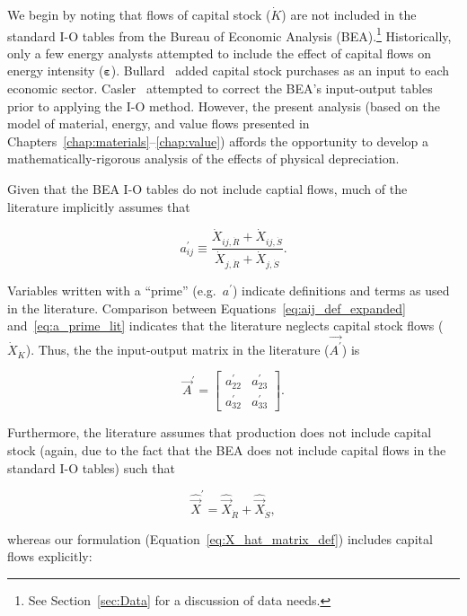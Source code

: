 We begin by noting that 
flows of capital stock ($\dot{K}$) are not included in the 
standard I-O tables from the
Bureau of Economic Analysis (BEA).\footnote{See
Section~\ref{sec:Data} for a discussion of data needs.}
Historically, only a few energy analysts attempted to include the effect
of capital flows on energy intensity ($\boldsymbol{\varepsilon}$). 
Bullard~\cite{Bullard1975} added capital stock purchases as an input
to each economic sector.
Casler~\cite{Casler:1983uy} attempted to correct the BEA's
input-output tables prior to applying the I-O method.
However, the present analysis (based on 
the model of material, energy, and value flows presented 
in Chapters~\ref{chap:materials}--\ref{chap:value})
affords the opportunity
to develop a mathematically-rigorous analysis
of the effects of physical depreciation.

Given that the BEA I-O tables do not include captial flows, 
much of the literature implicitly assumes that 

\begin{equation} \label{eq:a_prime_lit}
	a_{ij}^{'} 
	\equiv \frac{\dot{X}_{ij,\dot{R}} + \dot{X}_{ij,\dot{S}}}
				{\dot{X}_{j,\dot{R}} + \dot{X}_{j,\dot{S}}}.
\end{equation}

\noindent{}Variables written with a ``prime''
(e.g.\ $a^{'}$) indicate definitions and terms as used in the literature.
Comparison between Equations~\ref{eq:aij_def_expanded}
and~\ref{eq:a_prime_lit}
indicates that the literature neglects capital stock flows 
($\dot{X}_{\dot{K}}$).
Thus, the the input-output matrix in the literature
($\vec{A^{'}}$) is

\begin{equation} \label{eq:A_matrix_def_literature}
	\vec{A}^{'} 
	=
	\begin{bmatrix}
		a_{22}^{'} & a_{23}^{'}	\\
		a_{32}^{'} & a_{33}^{'}	
	\end{bmatrix}.
\end{equation}

Furthermore, the literature assumes that production does not include
capital stock (again, due to the fact that the BEA does not include 
capital flows in the standard I-O tables) such that

\begin{equation}
	\hat{\vec{X}}^{'} = \hat{\vec{X}}_{\dot{R}} + \hat{\vec{X}}_{\dot{S}},
\end{equation}

\noindent{}whereas our formulation (Equation~\ref{eq:X_hat_matrix_def})
includes capital flows explicitly:


